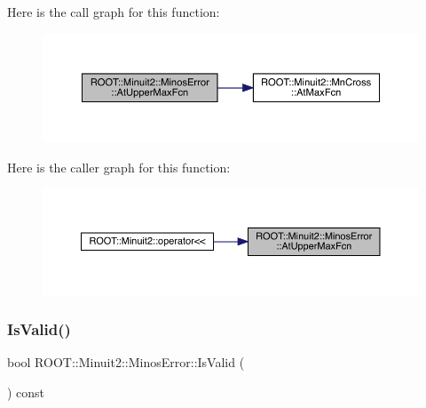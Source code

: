 Here is the call graph for this function\+:
\nopagebreak
\begin{figure}[H]
\begin{center}
\leavevmode
\includegraphics[width=350pt]{d2/dd1/classROOT_1_1Minuit2_1_1MinosError_a940c974f6ac87d22c4d340ef2fc88e8c_cgraph}
\end{center}
\end{figure}
Here is the caller graph for this function\+:
\nopagebreak
\begin{figure}[H]
\begin{center}
\leavevmode
\includegraphics[width=350pt]{d2/dd1/classROOT_1_1Minuit2_1_1MinosError_a940c974f6ac87d22c4d340ef2fc88e8c_icgraph}
\end{center}
\end{figure}
\mbox{\label{classROOT_1_1Minuit2_1_1MinosError_af6b7accfe397a06417ecc1f989d82e00}} 
\subsubsection{\texorpdfstring{IsValid()}{IsValid()}\hspace{0.1cm}{\footnotesize\ttfamily [1/3]}}
{\footnotesize\ttfamily bool R\+O\+O\+T\+::\+Minuit2\+::\+Minos\+Error\+::\+Is\+Valid (\begin{DoxyParamCaption}{ }\end{DoxyParamCaption}) const\hspace{0.3cm}{\ttfamily [inline]}}

